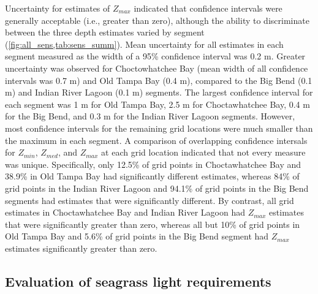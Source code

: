 \documentclass[letterpaper,12pt,oneside]{article}\usepackage[]{graphicx}\usepackage[]{color}
\begin{document}
Uncertainty for estimates of $Z_{max}$ indicated that confidence intervals were generally acceptable (i.e., greater than zero), although the ability to discriminate between the three depth estimates varied by segment (\cref{fig:all_sens,tab:sens_summ}).  Mean uncertainty for all estimates in each segment measured as the width of a 95\% confidence interval was 0.2 m.  Greater uncertainty was observed for Choctowhatchee Bay (mean width of all confidence intervals was 0.7 m) and Old Tampa Bay (0.4 m), compared to the Big Bend (0.1 m) and Indian River Lagoon (0.1 m) segments.  The largest confidence interval for each segment was 1 m for Old Tampa Bay, 2.5 m for Choctawhatchee Bay, 0.4 m for the Big Bend, and 0.3 m for the Indian River Lagoon segments.  However, most confidence intervals for the remaining grid locations were much smaller than the maximum in each segment.  A comparison of overlapping confidence intersals for $Z_{min}$, $Z_{med}$, and $Z_{max}$ at each grid location indicated that not every measure was unique.  Specifically, only 12.5\% of grid points in Choctawhatchee Bay and 38.9\% in Old Tampa Bay had significantly different estimates, whereas 84\% of grid points in the Indian River Lagoon and 94.1\% of grid points in the Big Bend segments had estimates that were significantly different.  By contrast, all grid estimates in Choctawhatchee Bay and Indian River Lagoon had $Z_{max}$ estimates that were significantly greater than zero, whereas all but 10\% of grid points in Old Tampa Bay and 5.6\% of grid points in the Big Bend segment had $Z_{max}$ estimates significantly greater than zero. 

\subsection{Evaluation of seagrass light requirements}
\end{document}
